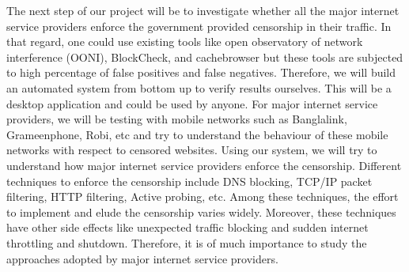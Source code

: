 \documentclass[12pt]{article}
\begin{document}
The next step of our project will be to investigate whether all the major internet service providers enforce the government provided censorship in their traffic. In that regard, one could use existing tools like open observatory of network interference (OONI), BlockCheck, and cachebrowser but these tools are subjected to high percentage of false positives and false negatives. Therefore, we will build an automated system from bottom up to verify results ourselves. This will be a desktop application and could be used by anyone.
For major internet service providers, we will be testing with mobile networks such as Banglalink, Grameenphone, Robi, etc and try to understand the behaviour of these mobile networks with respect to censored websites. Using our system, we will try to understand how major internet service providers enforce the censorship. Different techniques to enforce the censorship include DNS blocking, TCP/IP packet filtering, HTTP filtering, Active probing, etc. Among these techniques, the effort to implement and elude the censorship varies widely. Moreover, these techniques have other side effects like unexpected traffic blocking and sudden internet throttling and shutdown. Therefore, it is of much importance to study the approaches adopted by major internet service providers.
\end{document}
